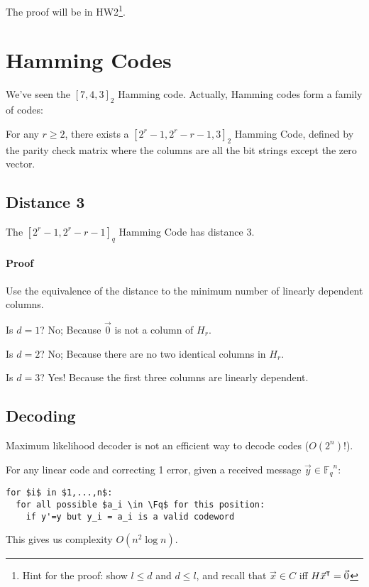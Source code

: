 \documentclass{idc_msc}
\newcommand{\Fq}{{\mathbb{F}_q}}
\newcommand{\T}{{\mathpalette\raiseT\intercal}}
\newcommand{\raiseT}[2]{\raisebox{0.25ex}{$#1#2$}}
\begin{document}
The proof will be in HW2\footnote{Hint for the proof: show \(l \le d\) and \(d \le l\), and recall that \(\vec{x} \in C\) iff \(H \vec{x}^\T = \vec{0}\)}.

\section{Hamming Codes}

We've seen the \([7,4,3]_2\) Hamming code.
Actually, Hamming codes form a family of codes:

For any \(r \ge 2\), there exists a \([2^r-1,2^r-r-1,3]_2\) Hamming Code, defined by the parity check matrix where the columns are all the bit strings except the zero vector.

\subsection{Distance 3}

The \([2^r-1,2^r-r-1]_q\) Hamming Code has distance 3.

\paragraph{Proof}

Use the equivalence of the distance to the minimum number of linearly dependent columns.

Is \(d = 1\)? No; Because \(\vec{0}\) is not a column of \(H_r\).

Is \(d = 2\)? No; Because there are no two identical columns in \(H_r\).

Is \(d = 3\)? Yes! Because the first three columns are linearly dependent.

\subsection{Decoding}

Maximum likelihood decoder is not an efficient way to decode codes (\(O(2^n)\)!).

For any linear code and correcting 1 error, given a received message \(\vec{y} \in \Fq^n\):

\begin{lstlisting}[frame=L,mathescape=true,title={Some code}]
for $i$ in $1,...,n$:
  for all possible $a_i \in \Fq$ for this position:
    if y'=y but y_i = a_i is a valid codeword
\end{lstlisting}

This gives us complexity \(O(n^2 \log n)\).
\end{document}
